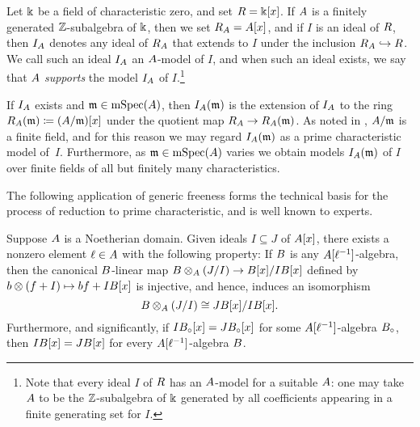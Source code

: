 \documentclass{article}
\begin{document}
\begin{definition}
   \label{reduction: D}
   Let $\Bbbk$ be a field of characteristic zero, and set $R = \Bbbk[x]$.
   If $A$ is a finitely generated $\mathbb{Z}$-subalgebra of $\Bbbk$, then we set $R_A = A[x]$, and if $I$ is an ideal of $R$, then $I_A$ denotes any ideal of $R_A$ that extends to $I$ under the inclusion $R_A \hookrightarrow R$.   We call such an ideal $I_A$ an $A$-model of $I$, and when such an ideal exists, we say that $A$ \emph{supports} {the model $I_A$ of $I$}.\footnote{Note that every ideal $I$ of $R$ has an $A$-model for a suitable $A$: one may take $A$ to be the $\mathbb{Z}$-subalgebra of $\Bbbk$ generated by all coefficients appearing in a finite generating set for $I$.}

   If $I_A$ exists and $\mathfrak{m} \in \operatorname{mSpec}(A)$, then $I_A(\mathfrak{m})$ is the extension of $I_A$ to the ring $R_{A}(\mathfrak{m}) \coloneqq (A/\mathfrak{m})[x]$ under the quotient map $R_A \to R_A(\mathfrak{m})$.
   As noted in , $A/\mathfrak{m}$ is a finite field, and for this reason we may regard $I_A(\mathfrak{m})$ as a prime characteristic model of~$I$.
   Furthermore, as $\mathfrak{m} \in \operatorname{mSpec}(A)$ varies we obtain models $I_A(\mathfrak{m})$ of $I$ over finite fields of all but finitely many characteristics.
\end{definition}

The following application of generic freeness forms the technical basis for the process of reduction to prime characteristic, and is well known to experts.  

\begin{proposition}
   \label{comparing expansions:  P}
   Suppose $A$ is a Noetherian domain.
   Given ideals $I \subseteq J$ of $A[x]$, there exists a nonzero element $\ell \in A$ with the following property\textup:
  If $B$ is any $A[\ell^{-1}]$-algebra, then the canonical $B$-linear map  $B \otimes_A (J/I) \to B[x]/I B[x]$ defined by $b \otimes (f+I) \mapsto bf+I B[x]$ is injective, and hence, induces an isomorphism \[ B \otimes_A (J/I) \cong J B[x] / I B[x].\]    
  Furthermore, and significantly, if $I B_{\circ}[x]=J B_{\circ}[x]$ for some $A[\ell^{-1}]$-algebra $B_{\circ}$, then $I B[x]=J B[x]$ for every $A[\ell^{-1}]$-algebra $B$.
  \end{proposition}
\end{document}
